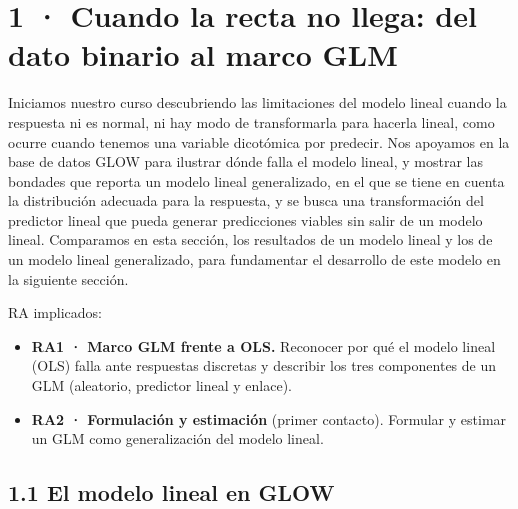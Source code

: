\documentclass[
  letterpaper,
  DIV=11,
  numbers=noendperiod]{scrartcl}
\providecommand{\tightlist}{%
  \setlength{\itemsep}{0pt}\setlength{\parskip}{0pt}}\usepackage{longtable,booktabs,array}
\begin{document}
\hypertarget{sec-u11}{%
\section{1 · Cuando la recta no llega: del dato binario al marco
GLM}\label{sec-u11}}

Iniciamos nuestro curso descubriendo las limitaciones del modelo lineal
cuando la respuesta ni es normal, ni hay modo de transformarla para
hacerla lineal, como ocurre cuando tenemos una variable dicotómica por
predecir. Nos apoyamos en la base de datos GLOW para ilustrar dónde
falla el modelo lineal, y mostrar las bondades que reporta un modelo
lineal generalizado, en el que se tiene en cuenta la distribución
adecuada para la respuesta, y se busca una transformación del predictor
lineal que pueda generar predicciones viables sin salir de un modelo
lineal. Comparamos en esta sección, los resultados de un modelo lineal y
los de un modelo lineal generalizado, para fundamentar el desarrollo de
este modelo en la siguiente sección.

\begin{tcolorbox}[enhanced jigsaw, breakable, colframe=quarto-callout-note-color-frame, left=2mm, arc=.35mm, colbacktitle=quarto-callout-note-color!10!white, toprule=.15mm, colback=white, coltitle=black, rightrule=.15mm, opacitybacktitle=0.6, title=\textcolor{quarto-callout-note-color}{\faInfo}\hspace{0.5em}{Sobre esta unidad}, titlerule=0mm, toptitle=1mm, bottomtitle=1mm, leftrule=.75mm, bottomrule=.15mm, opacityback=0]

RA implicados:

\begin{itemize}
\tightlist
\item
  \textbf{RA1 · Marco GLM frente a OLS.} Reconocer por qué el modelo
  lineal (OLS) falla ante respuestas discretas y describir los tres
  componentes de un GLM (aleatorio, predictor lineal y enlace).
\item
  \textbf{RA2 · Formulación y estimación} (primer contacto). Formular y
  estimar un GLM como generalización del modelo lineal.
\end{itemize}

\end{tcolorbox}

\hypertarget{el-modelo-lineal-en-glow}{%
\subsection{1.1 El modelo lineal en
GLOW}\label{el-modelo-lineal-en-glow}}
\end{document}
